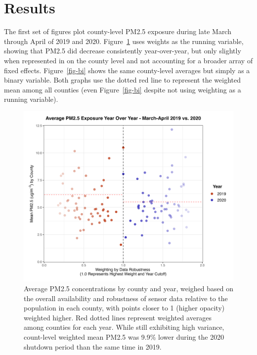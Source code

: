 \documentclass[12pt, ]{article}
\begin{document}
\newpage

\hypertarget{results}{%
\section{Results}\label{results}}

The first set of figures plot county-level PM2.5 exposure during late
March through April of 2019 and 2020. Figure~\ref{fig-rd} uses weights
as the running variable, showing that PM2.5 did decrease consistently
year-over-year, but only slightly when represented in on the county
level and not accounting for a broader array of fixed effects.
Figure~\ref{fig-bi} shows the same county-level averages but simply as a
binary variable. Both graphs use the dotted red line to represent the
weighted mean among all counties (even Figure~\ref{fig-bi} despite not
using weighting as a running variable).

\begin{figure}[H]

{\centering \includegraphics{figures/RD_CoWt_Scatterplot_19v20.png}

}

\caption{\label{fig-rd}Average PM2.5 concentrations by county and year,
weighed based on the overall availability and robustness of sensor data
relative to the population in each county, with points closer to 1
(higher opacity) weighted higher. Red dotted lines represent weighted
averages among counties for each year. While still exhibiting high
variance, count-level weighted mean PM2.5 was 9.9\% lower during the
2020 shutdown period than the same time in 2019.}

\end{figure}
\end{document}
